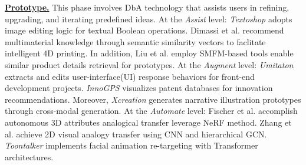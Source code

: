 \textbf{\underline{Prototype.}} This phase involves DbA technology that assists users in refining, upgrading, and iterating predefined ideas. At the \textit{Assist} level: \textit{Textoshop} adopts image editing logic for textual Boolean operations\cite{masson2025textoshop}. Dimassi et al. recommend multimaterial knowledge through semantic similarity vectors to  faclitate intelligent 4D printing\cite{dimassi2023knowledge}. In addition, Liu et al. employ SMFM-based tools enable similar product details retrieval for prototypes\cite{liu2023smfm}. At the \textit{Augment} level: \textit{Umitaton} extracts and edits user-interface(UI) response behaviors for front-end development projects\cite{chen2021umitation}. \textit{InnoGPS} visualizes patent databases for innovation recommendations\cite{luo2019computer}. Moreover, \textit{Xcreation} generates narrative illustration prototypes through cross-modal generation\cite{yan2023xcreation}. At the \textit{Automate} level: Fischer et al. accomplish autonomous 3D attributes analogical transfer  leverage NeRF method\cite{fischer2024nerf}. Zhang et al. achieve 2D visual analogy transfer using CNN and hierarchical GCN\cite{jin2022visual}. \textit{Toontalker} implements facial animation re-targeting with Transformer architectures\cite{gong2023toontalker}.



